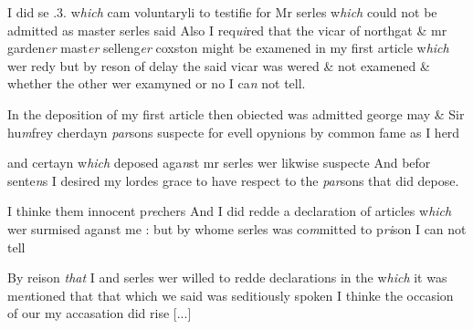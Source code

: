 \documentclass[12pt, a4paper]{book}
\begin{document}
	
		\ifthenelse{\isodd{\thepage}}
		{\reversemarginpar}
		{\normalmarginpar}
		I did se .3. w\textit{hich} cam voluntaryli to testifie for Mr serles w\textit{hich} could not be
admitted as master serles said
			 Also I req\textit{ui}red that the vicar of northgat \& mr garden\textit{er} mast\textit{er}
selleng\textit{er} coxston might be examened in my first article w\textit{hich} wer
redy but by reson of delay the said vicar was wered \& not examened
\& whether the other wer examyned or no I ca\textit{n} not tell.

				\marginpar[\vspace{0.5cm}{\textcolor{Gray}{8}}]{}
			

	
		\ifthenelse{\isodd{\thepage}}
		{\reversemarginpar}
		{\normalmarginpar}
		In the deposition of my first article then obiected was admitted 
george may \& Sir hu\textit{m}frey cherdayn \textit{par}sons suspecte for evell opynions by common fame as I herd
			
and certayn w\textit{hich} deposed aga\textit{n}st mr serles wer likwise suspecte And befor
sente\textit{n}s I desired my lordes grace  to have respect to the \textit{par}sons that did depose.
			

            		
				\marginpar[\vspace{0.5cm}{\textcolor{Gray}{9}}]{}
			

		\ifthenelse{\isodd{\thepage}}
		{\reversemarginpar}
		{\normalmarginpar}
		I thinke them innocent p\textit{re}chers And I did
			 redde a declaration of articles
w\textit{hich} wer surmised aganst me : but by whome serles was co\textit{m}mitted to
p\textit{ri}son I can not tell

				\marginpar[\vspace{0.5cm}{\textcolor{Gray}{10}}]{}
			

		\ifthenelse{\isodd{\thepage}}
		{\reversemarginpar}
		{\normalmarginpar}
		By reison \textit{that} I and serles wer willed to redde declarations in the 
w\textit{hich} it was me\textit{n}tioned that that which we said was seditiously
spoken I thinke the occasion of our
			 my accasation did rise 
				[...]
			
\end{document}
